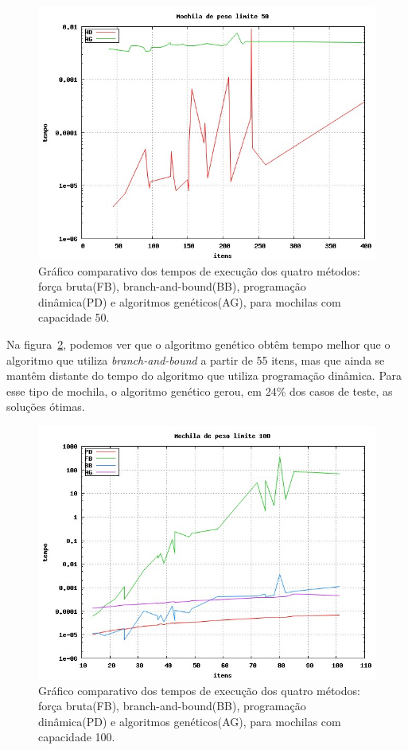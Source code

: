 \begin{figure}[htp]
	\centering
	\includegraphics[scale=0.4]{images/w50.jpg}
	\caption{Gráfico comparativo dos tempos de execução dos quatro métodos: força bruta(FB), branch-and-bound(BB), programação dinâmica(PD) e algoritmos genéticos(AG), para mochilas com capacidade 50.}
	\label{fig:w50}
\end{figure}

Na figura~\ref{fig:w100}, podemos ver que o algoritmo genético obtêm tempo melhor que o algoritmo que utiliza \textit{branch-and-bound} a partir de 55 itens, mas que ainda se mantêm distante do tempo do algoritmo que utiliza programação dinâmica. Para esse tipo de mochila, o algoritmo genético gerou, em 24\% dos casos de teste, as soluções ótimas.

\begin{figure}[htp]
	\centering
	\includegraphics[scale=0.4]{images/w100.jpg}
	\caption{Gráfico comparativo dos tempos de execução dos quatro métodos: força bruta(FB), branch-and-bound(BB), programação dinâmica(PD) e algoritmos genéticos(AG), para mochilas com capacidade 100.}
	\label{fig:w100}
\end{figure}

